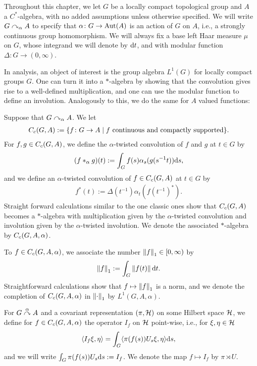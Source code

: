 Throughout this chapter, we let $G$ be a locally compact topological group and $A$ a $C^*$-algebra, with no added assumptions unless otherwise specified. We will write $G \curvearrowright_\alpha A$ to specify that $\alpha \colon G \to \operatorname{Aut}(A)$ is an action of $G$ on $A$, i.e., a strongly continuous group homomorphism. We will always fix a base left Haar measure $\mu$ on $G$, whose integrand we will denote by $\mathrm{d} t$, and with modular function $\Delta \colon G \to (0,\infty)$.

In analysis, an object of interest is the group algebra $L^1(G)$ for locally compact groups $G$. One can turn it into a $*$-algebra by showing that the convolution gives rise to a well-defined multiplication, and one can use the modular function to define an involution. Analogously to this, we do the same for $A$ valued functions:
\begin{definition}
	Suppose that $G \curvearrowright_\alpha A$. We let 
	\begin{align*}
		C_c(G,A):=\{ f \colon G \to A \mid f \text{ continuous and compactly supported}\}.
	\end{align*}
	For $f,g \in C_c(G,A)$, we define the $\alpha$-twisted convolution of $f$ and $g$ at $t \in G$ by
	\begin{align*}
		(f \ast_\alpha g)(t):= \int_G  f(s) \alpha_s(g(s^{-1}t)) \mathrm{d} s,
	\end{align*}
	and we define an $\alpha$-twisted convolution of $f \in C_c(G,A)$ at $t \in G$ by
	\begin{align*}
		f^*(t):=\Delta(t^{-1}) \alpha_t(f(t^{-1})^*).
	\end{align*}
	Straight forward calculations similar to the one classic ones show that $C_c(G,A)$ becomes a $*$-algebra with multiplication given by the $\alpha$-twisted convolution and involution given by the $\alpha$-twisted involution. We denote the associated $*$-algebra by $C_c(G,A,\alpha)$.
	
	To $f \in C_c(G,A,\alpha)$, we associate the number $\left\lVert f \right\rVert_1 \in [0, \infty)$ by
		\begin{align*}
			\left\lVert f \right\rVert_1 := \int_G \left\lVert f(t) \right\rVert \mathrm{d} t.
		\end{align*}
	Straightforward calculations show that $f \mapsto \left\lVert f \right\rVert_1$ is a norm, and we denote the completion of $C_c(G,A,\alpha)$ in $\left\lVert \cdot \right\rVert_1$ by $L^1(G,A,\alpha)$.
\end{definition}

For $G \stackrel{\alpha}{\curvearrowright} A$ and a covariant representation $(\pi,\mathcal{H})$ on some Hilbert space $\mathcal{H}$, we define for $f \in C_c(G,A,\alpha)$ the operator $I_{f}$ on $\mathcal{H}$ point-wise, i.e., for $\xi, \eta \in \mathcal{H}$
\begin{align*}
	\langle I_f \xi ,\eta \rangle = \int_G \langle \pi(f(s)) U_s \xi, \eta \rangle \mathrm{d} s,
\end{align*}
and we will write $\int_G \pi(f(s)) U_s \mathrm{d} s := I_f$. We denote the map $f \mapsto I_f$ by $\pi \rtimes U$.

